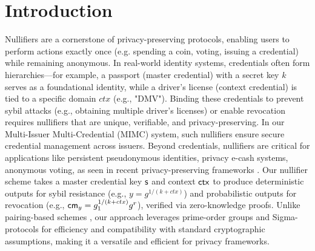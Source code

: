 \section{Introduction}\label{sec-vrf-introduction}
Nullifiers are a cornerstone of privacy-preserving protocols, enabling users to perform actions exactly once (e.g. spending a coin, voting, issuing a credential) while remaining anonymous. In real-world identity systems, credentials often form hierarchies—for example, a passport (master credential) with a secret key $k$ serves as a foundational identity, while a driver’s license (context credential) is tied to a specific domain $ctx$ (e.g., "DMV"). Binding these credentials to prevent sybil attacks (e.g., obtaining multiple driver’s licenses) or enable revocation requires nullifiers that are unique, verifiable, and privacy-preserving. In our Multi-Issuer Multi-Credential (MIMC) system, such nullifiers ensure secure credential management across issuers. Beyond credentials, nullifiers are critical for applications like persistent pseudonymous identities, privacy e-cash systems, anonymous voting, as seen in recent privacy-preserving frameworks \cite{gupta_plume_2022, goldberg_nsec5_2015, gurkan_community_2020, tomescu_utt_2022, ben_sasson_zerocash_2014}. Our nullifier scheme takes a master credential key $\mathsf{s}$ and context $\mathsf{ctx}$ to produce deterministic outputs for sybil resistance (e.g., $y = g^{1/(k + ctx)}$) and probabilistic outputs for revocation (e.g., $\mathsf{cm}_y = g_1^{1/(k + ctx)} g^r$), verified via zero-knowledge proofs. Unlike pairing-based schemes \cite{tomescu_utt_2022}, our approach leverages prime-order groups and Sigma-protocols for efficiency and compatibility with standard cryptographic assumptions, making it a versatile and efficient for privacy frameworks.


